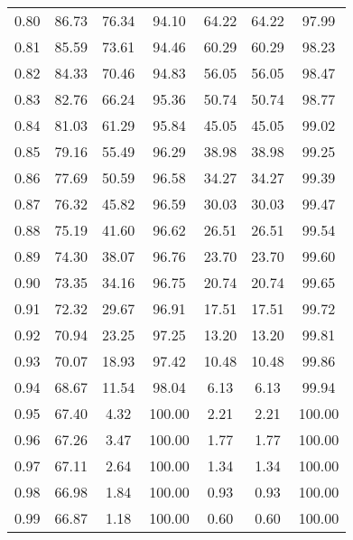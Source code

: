 \begin{tabular}{|c|c|c|c|c|c|c|}
      0.80 &     86.73 &     76.34 &      94.10 &   64.22 &      64.22 &         97.99 \\
      0.81 &     85.59 &     73.61 &      94.46 &   60.29 &      60.29 &         98.23 \\
      0.82 &     84.33 &     70.46 &      94.83 &   56.05 &      56.05 &         98.47 \\
      0.83 &     82.76 &     66.24 &      95.36 &   50.74 &      50.74 &         98.77 \\
      0.84 &     81.03 &     61.29 &      95.84 &   45.05 &      45.05 &         99.02 \\
      0.85 &     79.16 &     55.49 &      96.29 &   38.98 &      38.98 &         99.25 \\
      0.86 &     77.69 &     50.59 &      96.58 &   34.27 &      34.27 &         99.39 \\
      0.87 &     76.32 &     45.82 &      96.59 &   30.03 &      30.03 &         99.47 \\
      0.88 &     75.19 &     41.60 &      96.62 &   26.51 &      26.51 &         99.54 \\
      0.89 &     74.30 &     38.07 &      96.76 &   23.70 &      23.70 &         99.60 \\
      0.90 &     73.35 &     34.16 &      96.75 &   20.74 &      20.74 &         99.65 \\
      0.91 &     72.32 &     29.67 &      96.91 &   17.51 &      17.51 &         99.72 \\
      0.92 &     70.94 &     23.25 &      97.25 &   13.20 &      13.20 &         99.81 \\
      0.93 &     70.07 &     18.93 &      97.42 &   10.48 &      10.48 &         99.86 \\
      0.94 &     68.67 &     11.54 &      98.04 &    6.13 &       6.13 &         99.94 \\
      0.95 &     67.40 &      4.32 &     100.00 &    2.21 &       2.21 &        100.00 \\
      0.96 &     67.26 &      3.47 &     100.00 &    1.77 &       1.77 &        100.00 \\
      0.97 &     67.11 &      2.64 &     100.00 &    1.34 &       1.34 &        100.00 \\
      0.98 &     66.98 &      1.84 &     100.00 &    0.93 &       0.93 &        100.00 \\
      0.99 &     66.87 &      1.18 &     100.00 &    0.60 &       0.60 &        100.00 \\
\bottomrule
\end{tabular}
